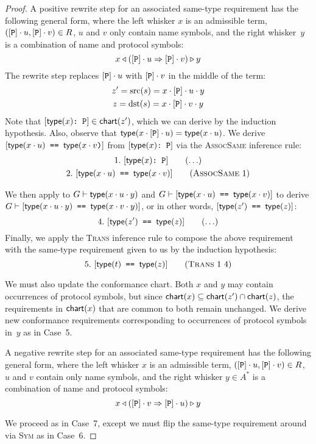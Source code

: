 \documentclass[../generics]{subfiles}
\begin{document}
\begin{proof}
 A positive rewrite step for an associated same-type requirement has the following general form, where the left whisker $x$ is an admissible term, $([\texttt{P}]\cdot u,[\texttt{P}] \cdot v)\in R$, $u$ and $v$ only contain name symbols, and the right whisker~$y$ is a combination of name and protocol symbols:
\[x\triangleleft([\texttt{P}]\cdot u\Rightarrow[\texttt{P}]\cdot v)\triangleright y\]
The rewrite step replaces $[\texttt{P}]\cdot u$ with $[\texttt{P}]\cdot v$ in the middle of the term:
\begin{gather*}
z^\prime=\operatorname{src}(s)=x\cdot[\texttt{P}]\cdot u\cdot y\\
z=\operatorname{dst}(s)=x\cdot[\texttt{P}]\cdot v\cdot y
\end{gather*}
Note that $[\texttt{$\mathsf{type}(x)$:~P}]\in\mathsf{chart}(z^\prime)$, which we can derive by the induction hypothesis. Also, observe that $\mathsf{type}(x\cdot[\texttt{P}]\cdot u)=\mathsf{type}(x\cdot u)$. We derive $[\texttt{$\mathsf{type}(x\cdot u)$ == $\mathsf{type}(x\cdot v$)}]$ from $[\texttt{$\mathsf{type}(x)$:~P}]$ via the \textsc{AssocSame} inference rule:
\begin{gather*}
\AnyStep{\ConfReq{$\Type(x)$}{P}}{1}\\
\AssocSameStep{1}{$\Type(x\cdot u)$}{$\Type(x\cdot v)$}{2}
\end{gather*}

We then apply  to $G\vdash\texttt{$\mathsf{type}(x\cdot u\cdot y)$}$ and $G\vdash[\texttt{$\mathsf{type}(x\cdot u)$ == $\mathsf{type}(x\cdot v)$}]$ to derive $G\vdash[\texttt{$\mathsf{type}(x\cdot u\cdot y)$ == $\mathsf{type}(x\cdot v\cdot y)$}]$, or in other words, $[\texttt{$\mathsf{type}(z^\prime)$ == $\mathsf{type}(z)$}]$:
\[
\AnyStep{\SameReq{$\Type(z^\prime)$}{$\Type(z)$}}{4}
\]
Finally, we apply the \textsc{Trans} inference rule to compose the above requirement with the same-type requirement given to us by the induction hypothesis:
\[
\TransStep{1}{4}{$\Type(t)$}{$\Type(z)$}{5}
\]

We must also update the conformance chart. Both $x$ and $y$ may contain occurrences of protocol symbols, but since $\mathsf{chart}(x)\subseteq\mathsf{chart}(z^\prime)\cap\mathsf{chart}(z)$, the requirements in $\mathsf{chart}(x)$ that are common to both remain unchanged. We derive new conformance requirements corresponding to occurrences of protocol symbols in~$y$ as in Case~5.

 A negative rewrite step for an associated same-type requirement has the following general form, where the left whisker $x$ is an admissible term, $([\texttt{P}]\cdot u,[\texttt{P}]\cdot v)\in R$, $u$ and $v$ contain only name symbols, and 
the right whisker $y\in A^*$ is a combination of name and protocol symbols:
\[x\triangleleft([\texttt{P}]\cdot v\Rightarrow[\texttt{P}]\cdot u)\triangleright y\]

We proceed as in Case~7, except we must flip the same-type requirement around via \textsc{Sym} as in Case~6.
\end{proof}
\end{document}
